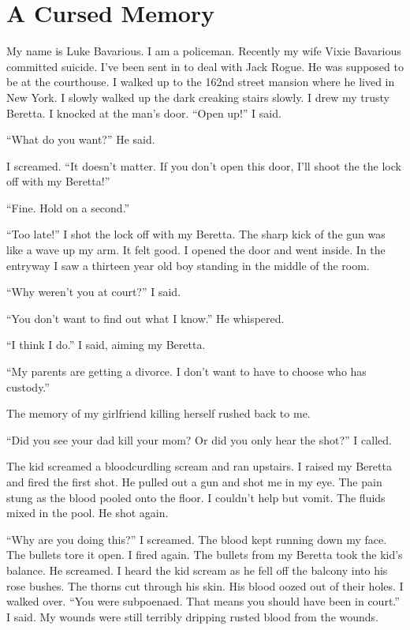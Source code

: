 \chapter{A Cursed Memory}


My name is Luke Bavarious. I am a policeman. Recently my wife Vixie
Bavarious committed suicide. I've been sent in to deal with
Jack Rogue. He was supposed to be at the courthouse. I walked up to
the 162nd street mansion where he lived in New York. I slowly
walked up the dark creaking stairs slowly. I drew my trusty
Beretta. I knocked at the man's door. ``Open up!''
I said.

``What do you want?'' He said.

I screamed. ``It doesn't matter. If you don't open
this door, I'll shoot the the lock off with my
Beretta!''

``Fine. Hold on a second.''

``Too late!'' I shot the lock off with my Beretta. The
sharp kick of the gun was like a wave up my arm. It felt good. I
opened the door and went inside. In the entryway I saw a thirteen
year old boy standing in the middle of the room.

``Why weren't you at court?'' I said.

``You don't want to find out what I know.'' He
whispered.

``I think I do.'' I said, aiming my Beretta.

``My parents are getting a divorce. I don't want to have
to choose who has custody.''

The memory of my girlfriend killing herself rushed back to
me.

``Did you see your dad kill your mom? Or did you only hear the
shot?'' I called.

The kid screamed a bloodcurdling scream and ran upstairs. I raised
my Beretta and fired the first shot. He pulled out a gun and shot
me in my eye. The pain stung as the blood pooled onto the floor. I
couldn't help but vomit. The fluids mixed in the pool. He
shot again.

``Why are you doing this?'' I screamed. The blood kept
running down my face. The bullets tore it open. I fired again. The
bullets from my Beretta took the kid's balance. He screamed.
I heard the kid scream as he fell off the balcony into his rose
bushes. The thorns cut through his skin. His blood oozed out of
their holes. I walked over. ``You were subpoenaed. That means
you should have been in court.'' I said. My wounds were still
terribly dripping rusted blood from the wounds.

